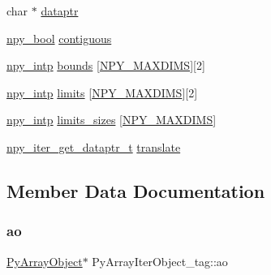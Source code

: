 \begin{DoxyCompactItemize}
\item 
char $\ast$ \hyperlink{structPyArrayIterObject__tag_a2ae653926ac88f8eb969d6d2510e8903}{dataptr}
\item 
\hyperlink{npy__common_8h_a95307a629b2747f357f81b3853c5d1b6}{npy\+\_\+bool} \hyperlink{structPyArrayIterObject__tag_a179df0bf4ab194a39c2ac54b0448c47f}{contiguous}
\item 
\hyperlink{npy__common_8h_a2d6effc4d5ecb85675ebfcfaa102b483}{npy\+\_\+intp} \hyperlink{structPyArrayIterObject__tag_a530220d35da250db912bf4a6a6d7dd34}{bounds} \mbox{[}\hyperlink{ndarraytypes_8h_a737679ea9ee902bfa707c146051c17b5}{N\+P\+Y\+\_\+\+M\+A\+X\+D\+I\+MS}\mbox{]}\mbox{[}2\mbox{]}
\item 
\hyperlink{npy__common_8h_a2d6effc4d5ecb85675ebfcfaa102b483}{npy\+\_\+intp} \hyperlink{structPyArrayIterObject__tag_a6e844318375eae95442b468132a81e1d}{limits} \mbox{[}\hyperlink{ndarraytypes_8h_a737679ea9ee902bfa707c146051c17b5}{N\+P\+Y\+\_\+\+M\+A\+X\+D\+I\+MS}\mbox{]}\mbox{[}2\mbox{]}
\item 
\hyperlink{npy__common_8h_a2d6effc4d5ecb85675ebfcfaa102b483}{npy\+\_\+intp} \hyperlink{structPyArrayIterObject__tag_a76551803a784bc282da68f1eb17bd5ff}{limits\+\_\+sizes} \mbox{[}\hyperlink{ndarraytypes_8h_a737679ea9ee902bfa707c146051c17b5}{N\+P\+Y\+\_\+\+M\+A\+X\+D\+I\+MS}\mbox{]}
\item 
\hyperlink{ndarraytypes_8h_ac00f3035372c5ae1bc9e6187aa135818}{npy\+\_\+iter\+\_\+get\+\_\+dataptr\+\_\+t} \hyperlink{structPyArrayIterObject__tag_a3b7bd1e1c71e7eef2513b65770cf9aa3}{translate}
\end{DoxyCompactItemize}


\subsection{Member Data Documentation}
\mbox{\label{structPyArrayIterObject__tag_abb701b2e74b1b0f83233d82b37ef5ed1}} 
\subsubsection{\texorpdfstring{ao}{ao}}
{\footnotesize\ttfamily \hyperlink{ndarraytypes_8h_af074aa0de75119b0769c7eff2bacf784}{Py\+Array\+Object}$\ast$ Py\+Array\+Iter\+Object\+\_\+tag\+::ao}

